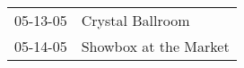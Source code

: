 \begin{supertabular}{p{0.07\textwidth}p{0.23\textwidth}}
 05-13-05 &       Crystal Ballroom \\
 05-14-05 &  Showbox at the Market \\
\end{supertabular}
